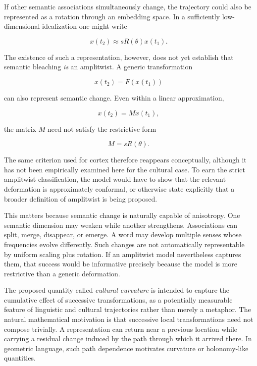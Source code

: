 \documentclass[11pt]{article}
\begin{document}
If other semantic associations simultaneously change, the trajectory could also be represented as a rotation through an embedding space. In a sufficiently low-dimensional idealization one might write

\begin{equation}
x(t_2)
\approx
sR(\theta)x(t_1).
\end{equation}

The existence of such a representation, however, does not yet establish that semantic bleaching \emph{is} an amplitwist. A generic transformation

\begin{equation}
x(t_2)=F(x(t_1))
\end{equation}

can also represent semantic change. Even within a linear approximation,

\begin{equation}
x(t_2)=Mx(t_1),
\end{equation}

the matrix $M$ need not satisfy the restrictive form

\begin{equation}
M=sR(\theta).
\end{equation}

The same criterion used for cortex therefore reappears conceptually, although it has not been empirically examined here for the cultural case. To earn the strict amplitwist classification, the model would have to show that the relevant deformation is approximately conformal, or otherwise state explicitly that a broader definition of amplitwist is being proposed.

This matters because semantic change is naturally capable of anisotropy. One semantic dimension may weaken while another strengthens. Associations can split, merge, disappear, or emerge. A word may develop multiple senses whose frequencies evolve differently. Such changes are not automatically representable by uniform scaling plus rotation. If an amplitwist model nevertheless captures them, that success would be informative precisely because the model is more restrictive than a generic deformation.

The proposed quantity called \emph{cultural curvature} is intended to capture the cumulative effect of successive transformations, as a potentially measurable feature of linguistic and cultural trajectories rather than merely a metaphor. The natural mathematical motivation is that successive local transformations need not compose trivially. A representation can return near a previous location while carrying a residual change induced by the path through which it arrived there. In geometric language, such path dependence motivates curvature or holonomy-like quantities.
\end{document}
